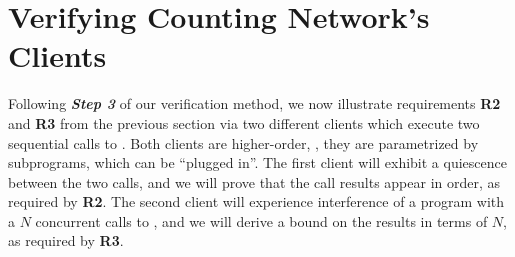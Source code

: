 
\section{Verifying Counting Network's Clients}
\label{sec:qclients}


Following \textbf{\emph{Step 3}} of our verification method, we now
illustrate requirements \textbf{R2} and \textbf{R3} from the previous
section via two different clients which execute two sequential calls
to . Both clients are higher-order, \ie, they are
parametrized by subprograms, which can be ``plugged in''.
%
The first client will exhibit a quiescence between the two calls, and
we will prove that the call results appear in order, as required by
\textbf{R2}. The second client will experience interference of a
program with a $N$ concurrent calls to , and we will
derive a bound on the results in terms of $N$, as required by
\textbf{R3}.

